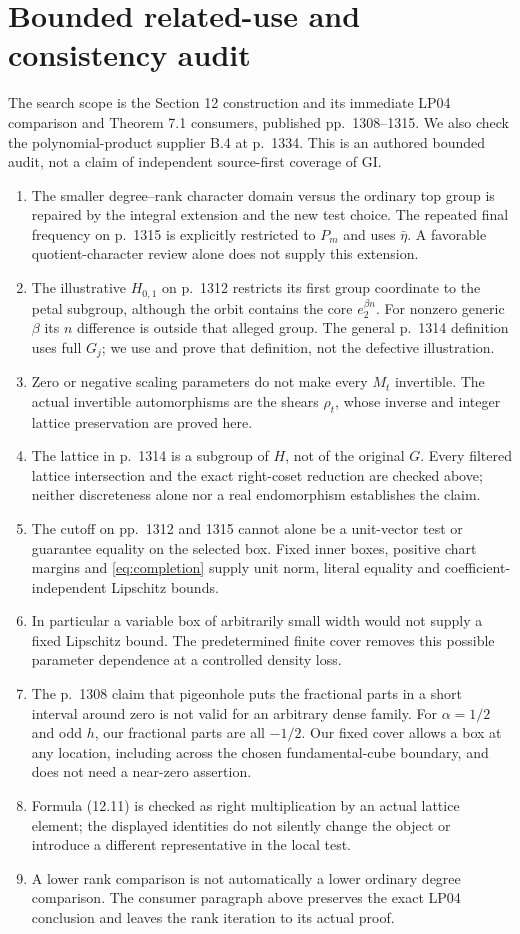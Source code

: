 \documentclass[11pt]{article}
\begin{document}
\section{Bounded related-use and consistency audit}
The search scope is the Section 12 construction and its immediate LP04
comparison and Theorem 7.1 consumers, published pp.~1308--1315. We also
check the polynomial-product supplier B.4 at p.~1334. This is an authored
bounded audit, not a claim of independent source-first coverage of GI.
\begin{enumerate}
\item The smaller degree--rank character domain versus the ordinary
top group is repaired by the integral extension and the new test choice.
The repeated final frequency on p.~1315 is explicitly restricted to
$P_m$ and uses $\bar\eta$. A favorable quotient-character review alone
does not supply this extension.
\item The illustrative $H_{0,1}$ on p.~1312 restricts its first group
coordinate to the petal subgroup, although the orbit contains the core
$e_2^{\beta n}$. For nonzero generic $\beta$ its $n$ difference is outside
that alleged group. The general p.~1314 definition uses full $G_j$;
we use and prove that definition, not the defective illustration.
\item Zero or negative scaling parameters do not make every $M_t$
invertible. The actual invertible automorphisms are the shears $\rho_t$,
whose inverse and integer lattice preservation are proved here.
\item The lattice in p.~1314 is a subgroup of $H$, not of the original
$G$. Every filtered lattice intersection and the exact right-coset
reduction are checked above; neither discreteness alone nor a real
endomorphism establishes the claim.
\item The cutoff on pp.~1312 and 1315 cannot alone be a unit-vector
test or guarantee equality on the selected box. Fixed inner boxes,
positive chart margins and \eqref{eq:completion} supply unit norm,
literal equality and coefficient-independent Lipschitz bounds.
\item In particular a variable box of arbitrarily small width would
not supply a fixed Lipschitz bound. The predetermined finite cover
removes this possible parameter dependence at a controlled density loss.
\item The p.~1308 claim that pigeonhole puts the fractional parts in a
short interval around zero is not valid for an arbitrary dense family.
For $\alpha=1/2$ and odd $h$, our fractional parts are all $-1/2$.
Our fixed cover allows a box at any location, including across the chosen
fundamental-cube boundary, and does not need a near-zero assertion.
\item Formula (12.11) is checked as right multiplication by an actual
lattice element; the displayed identities do not silently change the
object or introduce a different representative in the local test.
\item A lower rank comparison is not automatically a lower ordinary
degree comparison. The consumer paragraph above preserves the exact
LP04 conclusion and leaves the rank iteration to its actual proof.
\end{enumerate}
\end{document}
